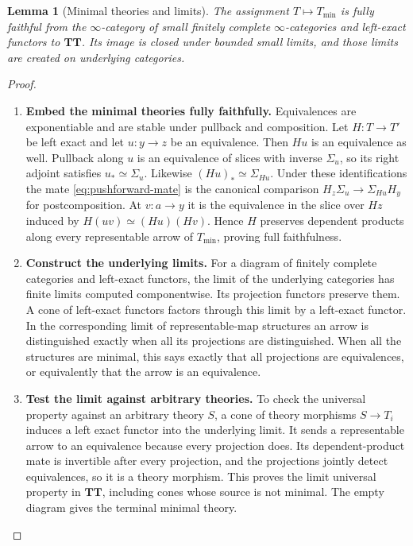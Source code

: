 \documentclass[oneside]{article}
\theoremstyle{plain}
\newtheorem{lemma}[theorem]{Lemma}
\theoremstyle{definition}
\theoremstyle{remark}
\newcommand{\TT}{\mathbf{TT}}
\newcommand{\minrep}{\mathrm{min}}
\begin{document}
\begin{lemma}[Minimal theories and limits]\label{lem:minimal}
The assignment $T\mapsto T_{\minrep}$ is fully faithful from the $\infty$-category of small finitely complete $\infty$-categories and left-exact functors to $\TT$. Its image is closed under bounded small limits, and those limits are created on underlying categories.
\end{lemma}
\begin{proof}
\leavevmode
\begin{enumerate}
\item \textbf{Embed the minimal theories fully faithfully.} Equivalences
are exponentiable and are stable under pullback and composition. Let
$H:T\to T'$ be left exact and let $u:y\to z$ be an equivalence. Then
$Hu$ is an equivalence as well. Pullback along $u$ is an equivalence
of slices with inverse $\Sigma_u$, so its right adjoint satisfies
$u_*\simeq\Sigma_u$. Likewise $(Hu)_*\simeq\Sigma_{Hu}$. Under these
identifications the mate \eqref{eq:pushforward-mate} is the canonical
comparison $H_z\Sigma_u\to\Sigma_{Hu}H_y$ for postcomposition.
At $v:a\to y$ it is the equivalence in the slice over $Hz$ induced
by $H(uv)\simeq(Hu)(Hv)$. Hence $H$ preserves dependent products
along every representable arrow of $T_{\minrep}$, proving full
faithfulness.
\item \textbf{Construct the underlying limits.} For a diagram of finitely complete categories and left-exact functors, the limit of the underlying categories has finite limits computed componentwise. Its projection functors preserve them. A cone of left-exact functors factors through this limit by a left-exact functor. In the corresponding limit of representable-map structures an arrow is distinguished exactly when all its projections are distinguished. When all the structures are minimal, this says exactly that all projections are equivalences, or equivalently that the arrow is an equivalence.
\item \textbf{Test the limit against arbitrary theories.} To check the universal property against an arbitrary theory $S$, a cone
of theory morphisms $S\to T_i$ induces a left exact functor into the
underlying limit. It sends a representable arrow to an equivalence because
every projection does. Its dependent-product mate is invertible after
every projection, and the projections jointly detect equivalences, so it
is a theory morphism. This proves the limit universal property in $\TT$,
including cones whose source is not minimal. The empty diagram gives the
terminal minimal theory.\qedhere
\end{enumerate}
\end{proof}
\end{document}

